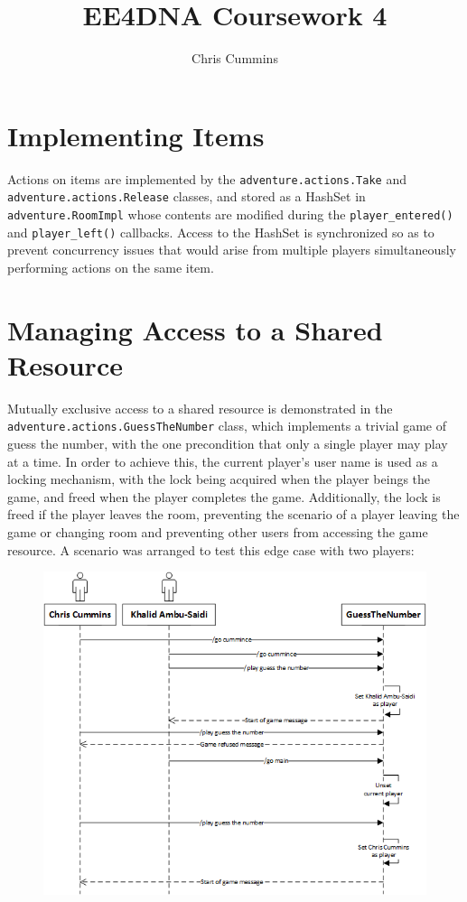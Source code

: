 \documentclass[12pt,a4paper]{article}
\title{EE4DNA Coursework 4}
\author{Chris Cummins}
\begin{document}
\maketitle

\section{Implementing Items}

Actions on items are implemented by the
\texttt{adventure.actions.Take} and \texttt{adventure.actions.Release}
classes, and stored as a HashSet in \texttt{adventure.RoomImpl} whose
contents are modified during the \texttt{player\_entered()} and
\texttt{player\_left()} callbacks. Access to the HashSet is
synchronized so as to prevent concurrency issues that would arise from
multiple players simultaneously performing actions on the same item.

\section{Managing Access to a Shared Resource}

Mutually exclusive access to a shared resource is demonstrated in the
\texttt{adventure.actions.GuessTheNumber} class, which implements a
trivial game of guess the number, with the one precondition that only
a single player may play at a time. In order to achieve this, the
current player's user name is used as a locking mechanism, with the
lock being acquired when the player beings the game, and freed when
the player completes the game. Additionally, the lock is freed if the
player leaves the room, preventing the scenario of a player leaving
the game or changing room and preventing other users from accessing
the game resource. A scenario was arranged to test this edge case with
two players:

\begin{figure}[H]
  \centering
  \includegraphics[width=5.5in]{assets/sequence.png}
\end{figure}
\end{document}

